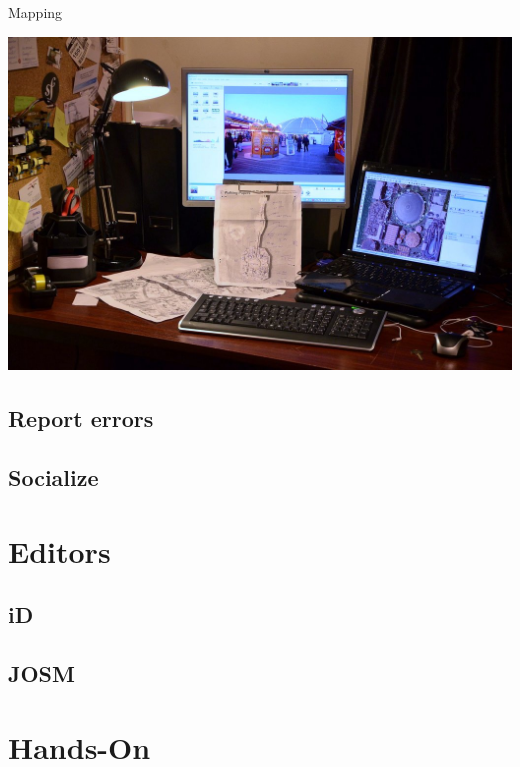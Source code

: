 \documentclass{beamer}
\begin{document}
	\begin{frame}{Mapping}
		\begin{center}
			\includegraphics[width=0.8\linewidth,height=0.8\textheight,keepaspectratio]{images/mapping_outdoor}
		\end{center}
	\end{frame}
	
	\subsection{Report errors}
	
	\subsection{Socialize}
	
	\section{Editors}
	
	\subsection{iD}
	
	\subsection{JOSM}
	
	\section{Hands-On}
\end{document}
